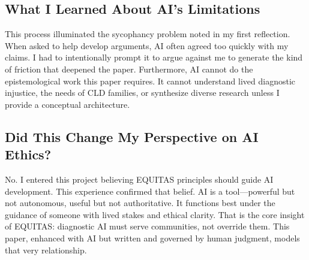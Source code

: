 \documentclass[12pt,a4paper]{article}
\begin{document}
\subsection{What I Learned About AI's Limitations}

This process illuminated the sycophancy problem noted in my first reflection. When asked to help develop arguments, AI often agreed too quickly with my claims. I had to intentionally prompt it to argue against me to generate the kind of friction that deepened the paper. Furthermore, AI cannot do the epistemological work this paper requires. It cannot understand lived diagnostic injustice, the needs of CLD families, or synthesize diverse research unless I provide a conceptual architecture.

\subsection{Did This Change My Perspective on AI Ethics?}

No. I entered this project believing EQUITAS principles should guide AI development. This experience confirmed that belief. AI is a tool—powerful but not autonomous, useful but not authoritative. It functions best under the guidance of someone with lived stakes and ethical clarity. That is the core insight of EQUITAS: diagnostic AI must serve communities, not override them. This paper, enhanced with AI but written and governed by human judgment, models that very relationship.



\clearpage


\end{document}
